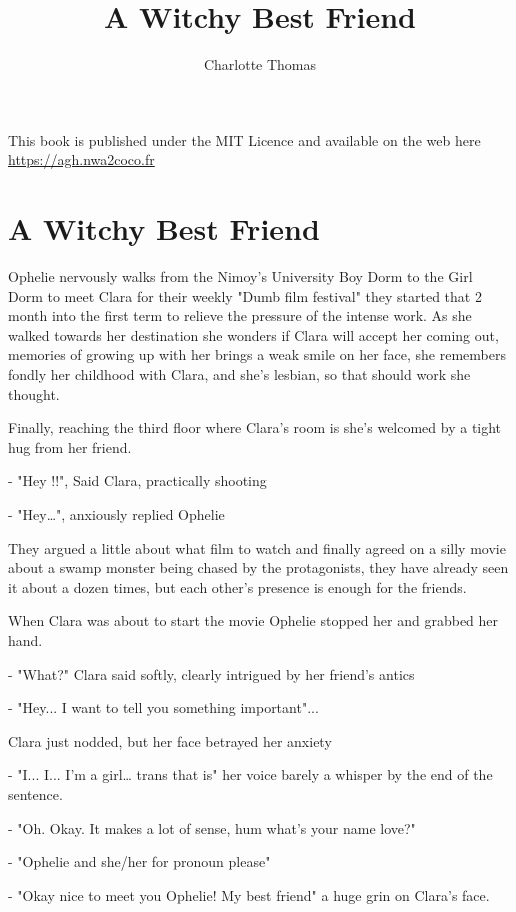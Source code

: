 \documentclass[hidelinks,12pt]{book}
\title{A Witchy Best Friend}
\author{Charlotte Thomas}
\begin{document}
\maketitle
This book is published under the MIT Licence and available on the web here \url{https://agh.nwa2coco.fr}
\chapter{A Witchy Best Friend}

Ophelie nervously walks from the Nimoy's University Boy Dorm to the Girl Dorm to meet Clara for their weekly 
"Dumb film festival" they started that 2 month into the first term to relieve the pressure of the intense work.
As she walked towards her destination she wonders if Clara will accept her coming out, memories of growing up with 
her brings a weak smile on her face, she remembers fondly her childhood with Clara, and she's lesbian, so that 
should work she thought.\par 
\bigskip 

Finally, reaching the third floor where Clara's room is she's welcomed by a tight hug from her friend.\par
- "Hey !!", Said Clara, practically shooting\par
- "Hey…", anxiously replied Ophelie\par
\bigskip

They argued a little about what film to watch and finally agreed on a silly movie about a swamp monster being 
chased by the protagonists, they have already seen it about a dozen times, but each other's presence is enough 
for the friends.\par 
\bigskip

When Clara was about to start the movie Ophelie stopped her and grabbed her hand.\par
- "What?" Clara said softly, clearly intrigued by her friend's antics\par
- "Hey... I want to tell you something important"...\par
\bigskip

Clara just nodded, but her face betrayed her anxiety\par
- "I... I... I'm a girl… trans that is" her voice barely a whisper by the end of the sentence.\par
- "Oh. Okay. It makes a lot of sense, hum what's your name love?"\par
- "Ophelie and she/her for pronoun please" \par 
- "Okay nice to meet you Ophelie! My best friend" a huge grin on Clara's face.\par
\bigskip
\end{document}
